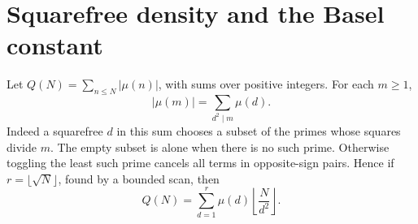 \section{Squarefree density and the Basel constant}\label{sec:squarefree}

Let $Q(N)=\sum_{n\le N}|\mu(n)|$, with sums over positive
integers. For each $m\ge1$,
\[
          |\mu(m)|=\sum_{d^2\mid m}\mu(d).
\]
Indeed a squarefree $d$ in this sum chooses a subset of the primes
whose squares divide $m$. The empty subset is alone when there is no
such prime. Otherwise toggling the least such prime cancels all terms
in opposite-sign pairs. Hence if $r=\lfloor\sqrt N\rfloor$, found
by a bounded scan, then
\[
                 Q(N)=\sum_{d=1}^{r}\mu(d)
                              \left\lfloor\frac{N}{d^2}\right\rfloor.
\]

